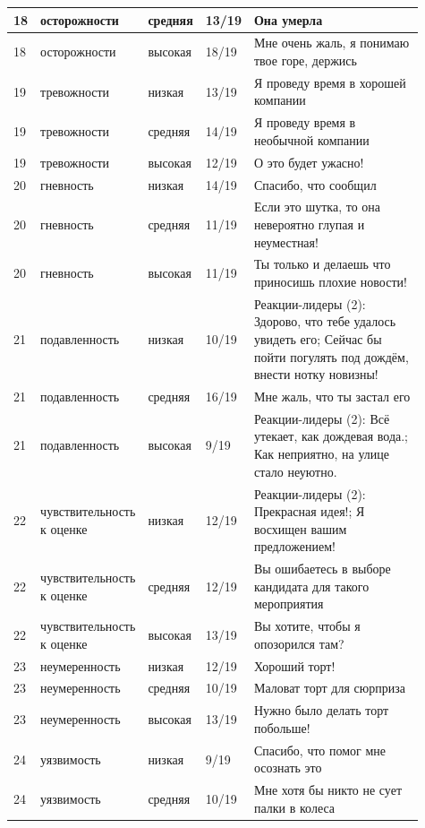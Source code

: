 \begin{landscape}
\begin{longtable}{|p{0.06\linewidth}|p{0.2\linewidth}|p{0.11\linewidth}|p{0.08\linewidth}|p{0.46\linewidth}|}
		\hline
		18 & осторожности & средняя & 13/19 & Она умерла \\
		\hline
		18 & осторожности & высокая & 18/19 & Мне очень жаль, я понимаю твое горе, держись \\
		\hline
		19 & тревожности & низкая & 13/19 & Я проведу время в хорошей компании \\
		\hline
		19 & тревожности & средняя & 14/19 & Я проведу время в необычной компании \\
		\hline
		19 & тревожности & высокая & 12/19 & О это будет ужасно! \\
		\hline
		20 & гневность & низкая & 14/19 & Спасибо, что сообщил \\
		\hline
		20 & гневность & средняя & 11/19 & Если это шутка, то она невероятно глупая и неуместная! \\
		\hline
		20 & гневность & высокая & 11/19 & Ты только и делаешь что приносишь плохие новости! \\
		\hline
		21 & подавленность & низкая & 10/19 & Реакции-лидеры (2): Здорово, что тебе удалось увидеть его; Сейчас бы пойти погулять под дождём, внести нотку новизны! \\
		\hline
		21 & подавленность & средняя & 16/19 & Мне жаль, что ты застал его \\
		\hline
		21 & подавленность & высокая & 9/19 & Реакции-лидеры (2): Всё утекает, как дождевая вода.; Как неприятно, на улице стало неуютно. \\
		\hline
		22 & чувствительность к оценке & низкая & 12/19 & Реакции-лидеры (2): Прекрасная идея!; Я восхищен вашим предложением! \\
		\hline
		22 & чувствительность к оценке & средняя & 12/19 & Вы ошибаетесь в выборе кандидата для такого мероприятия \\
		\hline
		22 & чувствительность к оценке & высокая & 13/19 & Вы хотите, чтобы я опозорился там? \\
		\hline
		23 & неумеренность & низкая & 12/19 & Хороший торт! \\
		\hline
		23 & неумеренность & средняя & 10/19 & Маловат торт для сюрприза \\
		\hline
		23 & неумеренность & высокая & 13/19 & Нужно было делать торт побольше! \\
		\hline
		24 & уязвимость & низкая & 9/19 & Спасибо, что помог мне осознать это \\
		\hline
		24 & уязвимость & средняя & 10/19 & Мне хотя бы никто не сует палки в колеса \\
		\hline

\end{longtable}
\end{landscape}
